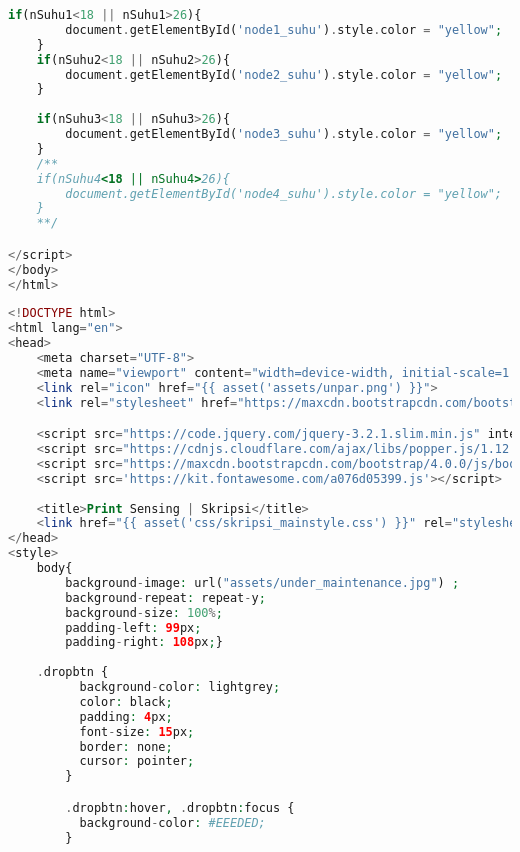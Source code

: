 \begin{lstlisting}[language=PHP, caption=skripsi\_sensing.blade.php]
    if(nSuhu1<18 || nSuhu1>26){
        document.getElementById('node1_suhu').style.color = "yellow";
    }
    if(nSuhu2<18 || nSuhu2>26){
        document.getElementById('node2_suhu').style.color = "yellow";
    }
    
    if(nSuhu3<18 || nSuhu3>26){
        document.getElementById('node3_suhu').style.color = "yellow";
    }
    /**
    if(nSuhu4<18 || nSuhu4>26){
        document.getElementById('node4_suhu').style.color = "yellow";
    }
    **/

</script>
</body>
</html>
\end{lstlisting}

\begin{lstlisting}[language=PHP, caption=skripsi\_perangkat.blade.php]
<!DOCTYPE html>
<html lang="en">
<head>
    <meta charset="UTF-8">
    <meta name="viewport" content="width=device-width, initial-scale=1.0, shrink-to-fit=no">
    <link rel="icon" href="{{ asset('assets/unpar.png') }}">
    <link rel="stylesheet" href="https://maxcdn.bootstrapcdn.com/bootstrap/4.0.0/css/bootstrap.min.css" integrity="sha384-Gn5384xqQ1aoWXA+058RXPxPg6fy4IWvTNh0E263XmFcJlSAwiGgFAW/dAiS6JXm" crossorigin="anonymous">

    <script src="https://code.jquery.com/jquery-3.2.1.slim.min.js" integrity="sha384-KJ3o2DKtIkvYIK3UENzmM7KCkRr/rE9/Qpg6aAZGJwFDMVNA/GpGFF93hXpG5KkN" crossorigin="anonymous"></script>
    <script src="https://cdnjs.cloudflare.com/ajax/libs/popper.js/1.12.9/umd/popper.min.js" integrity="sha384-ApNbgh9B+Y1QKtv3Rn7W3mgPxhU9K/ScQsAP7hUibX39j7fakFPskvXusvfa0b4Q" crossorigin="anonymous"></script>
    <script src="https://maxcdn.bootstrapcdn.com/bootstrap/4.0.0/js/bootstrap.min.js" integrity="sha384-JZR6Spejh4U02d8jOt6vLEHfe/JQGiRRSQQxSfFWpi1MquVdAyjUar5+76PVCmYl" crossorigin="anonymous"></script>
    <script src='https://kit.fontawesome.com/a076d05399.js'></script>
    
    <title>Print Sensing | Skripsi</title>
    <link href="{{ asset('css/skripsi_mainstyle.css') }}" rel="stylesheet" type="text/css" >
</head>
<style>
    body{
        background-image: url("assets/under_maintenance.jpg") ;
        background-repeat: repeat-y;
        background-size: 100%;
        padding-left: 99px;
        padding-right: 108px;}
        
    .dropbtn {
          background-color: lightgrey;
          color: black;
          padding: 4px;
          font-size: 15px;
          border: none;
          cursor: pointer;
        }

        .dropbtn:hover, .dropbtn:focus {
          background-color: #EEEDED;
        }


\end{lstlisting}
